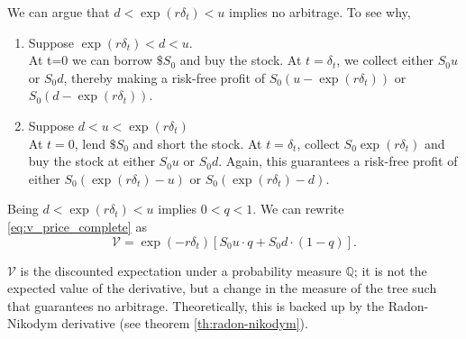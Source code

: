 \documentclass[../TGMAFFIRO.tex]{subfiles}
\begin{document}
We can argue that $d < \exp{(r\delta_t)} < u$ implies no arbitrage. To see why, 
\begin{enumerate}
\item Suppose $\exp{(r\delta_t)} < d < u$.\\
    At t=0 we can borrow $\$S_0$ and buy the stock. At $t=\delta_t$, we collect either $S_0u$ or $S_0d$, thereby making a risk-free profit of $S_0(u - \exp{(r\delta_t)})$ or $S_0(d - \exp{(r\delta_t)})$.

\item Suppose $d < u < \exp{(r\delta_t)}$\\
    At $t=0$, lend $\$S_0$ and short the stock. At $t=\delta_t$, collect $S_0\exp{(r\delta_t)}$ and buy the stock at either $S_0u$ or $S_0d$. Again, this guarantees a risk-free profit of either $S_0(\exp{(r\delta_t)} - u)$ or $S_0(\exp{(r\delta_t)} - d)$.
\end{enumerate}

Being $d < \exp{(r\delta_t)} < u$ implies $0 < q < 1$. We can rewrite \ref{eq:v_price_complete} as
\begin{equation} \label{eq:v_price}
    \mathcal{V} = \exp{(-r\delta_t)}[S_0u\cdot q + S_0d \cdot (1-q)].
\end{equation}


$\mathcal V$ is the discounted expectation under a probability measure $\mathbb Q$; it is not the expected value of the derivative, but a change in the measure of the tree such that guarantees no arbitrage. Theoretically, this is backed up by the Radon-Nikodym derivative (see theorem \ref{th:radon-nikodym}).
\end{document}
